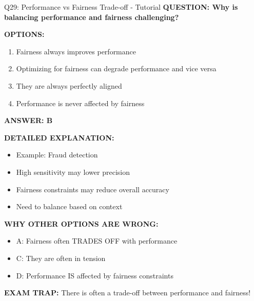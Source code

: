 \documentclass[8pt]{beamer}
\begin{document}
	\begin{frame}{Q29: Performance vs Fairness Trade-off - Tutorial}
		\fontsize{6.5}{7.5}\selectfont
		\textbf{QUESTION: Why is balancing performance and fairness challenging?}
		
		\vspace{0.1cm}
		\textbf{OPTIONS:}
		\begin{enumerate}
			\item Fairness always improves performance
			\item Optimizing for fairness can degrade performance and vice versa
			\item They are always perfectly aligned
			\item Performance is never affected by fairness
		\end{enumerate}
		
		\vspace{0.1cm}
		\textcolor{myblue}{\textbf{ANSWER: B}}
		
		\vspace{0.1cm}
		\textbf{DETAILED EXPLANATION:}
		\begin{itemize}
			\item Example: Fraud detection
			\item High sensitivity may lower precision
			\item Fairness constraints may reduce overall accuracy
			\item Need to balance based on context
		\end{itemize}
		
		\vspace{0.1cm}
		\textcolor{myred}{\textbf{WHY OTHER OPTIONS ARE WRONG:}}
		\begin{itemize}
			\item \textcolor{myred}{A:} Fairness often TRADES OFF with performance
			\item \textcolor{myred}{C:} They are often in tension
			\item \textcolor{myred}{D:} Performance IS affected by fairness constraints
		\end{itemize}
		
		\textcolor{myred}{\textbf{EXAM TRAP:}} There is often a \textcolor{myblue}{trade-off between performance and fairness}!
	\end{frame}
	
\end{document}
